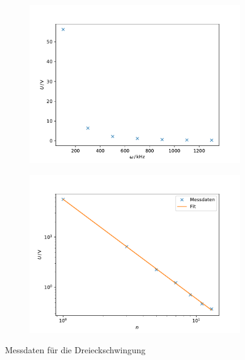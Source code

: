 \begin{figure}[h]
\begin{subfigure}{0.5\textwidth}
    \centering
    \includegraphics[width=\textwidth]{assets/dreieck_messung.pdf}
\end{subfigure}
\begin{subfigure}{0.5\textwidth}
    \centering
    \includegraphics[width=\textwidth]{assets/dreieck_log.pdf}
\end{subfigure}
\caption{Messdaten für die Dreieckschwingung}
\label{fig:dreieck_fit}
\end{figure}



